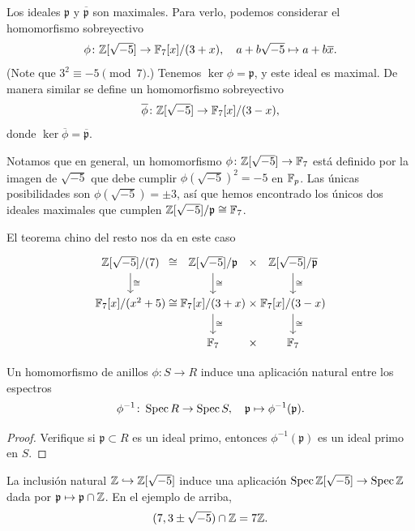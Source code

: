 \begin{ejemplo}
  Los ideales $\mathfrak{p}$ y $\overline{\mathfrak{p}}$ son maximales.
  Para verlo, podemos considerar el homomorfismo sobreyectivo
  \[ \phi\colon \mathbb{Z}[\sqrt{-5}] \to \mathbb{F}_7 [x]/(3 + x), \quad
     a + b\sqrt{-5} \mapsto a + b\overline{x}. \]
  (Note que $3^2 \equiv -5 \pmod{7}$.)
  Tenemos $\ker\phi = \mathfrak{p}$, y este ideal es maximal.
  De manera similar se define un homomorfismo sobreyectivo
  $$\overline{\phi}\colon \mathbb{Z}[\sqrt{-5}] \to \mathbb{F}_7 [x]/(3 - x),$$
  donde $\ker\overline{\phi} = \overline{\mathfrak{p}}$.

  Notamos que en general, un homomorfismo $\phi\colon \mathbb{Z} [\sqrt{-5}] \to \mathbb{F}_7$
  está definido por la imagen de $\sqrt{-5}$ que debe cumplir
  $\phi (\sqrt{-5})^2 = -5$ en $\mathbb{F}_p$. Las únicas posibilidades son
  $\phi (\sqrt{-5}) = \pm 3$, así que hemos encontrado los únicos dos ideales
  maximales que cumplen $\mathbb{Z} [\sqrt{-5}]/\mathfrak{p} \cong \mathbb{F}_7$.

  El teorema chino del resto nos da en este caso
  \[ \begin{tikzcd}
    \ZZ [\sqrt{-5}]/(7) \ar{d}{\cong} &[-3em] \cong &[-3em] \ZZ[\sqrt{-5}]/\mathfrak{p} \ar{d}{\cong} &[-3em] \times &[-3em] \ZZ[\sqrt{-5}]/\overline{\mathfrak{p}} \ar{d}{\cong} \\
    \FF_7 [x]/(x^2 + 5) & \cong & \FF_7 [x]/(3 + x) \ar{d}{\cong} & \times & \FF_7 [x] / (3 - x) \ar{d}{\cong} \\
     && \FF_7 & \times & \FF_7
  \end{tikzcd} \]
\end{ejemplo}

\begin{proposicion}
  Un homomorfismo de anillos $\phi\colon S\to R$ induce una aplicación natural
  entre los espectros
  $$\phi^{-1}\colon \operatorname{Spec} R\to \operatorname{Spec} S, \quad
    \mathfrak{p} \mapsto \phi^{-1} (\mathfrak{p}).$$

  \begin{proof}
    Verifique si $\mathfrak{p} \subset R$ es un ideal primo, entonces
    $\phi^{-1} (\mathfrak{p})$ es un ideal primo en $S$.
  \end{proof}
\end{proposicion}

\begin{ejemplo}
  La inclusión natural $\mathbb{Z} \hookrightarrow \mathbb{Z} [\sqrt{-5}]$ induce
  una aplicación $\operatorname{Spec} \mathbb{Z} [\sqrt{-5}] \to \operatorname{Spec} \mathbb{Z}$ dada por
  $\mathfrak{p} \mapsto \mathfrak{p} \cap \mathbb{Z}$. En el ejemplo de arriba,
  \[ (7, 3 \pm \sqrt{-5}) \cap \mathbb{Z} = 7\mathbb{Z}. \qedhere \]
\end{ejemplo}

